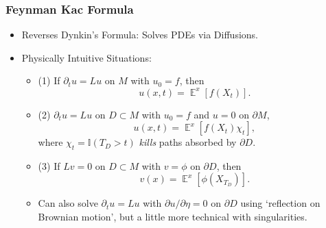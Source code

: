 \documentclass[usenames,dvipsnames,12pt]{beamer}
\DeclareMathOperator{\EE}{\mathbb{E}}
\begin{document}
\begin{frame}
    \frametitle{Feynman Kac Formula}

    \begin{itemize}
        \item Reverses Dynkin's Formula: Solves PDEs via Diffusions.

        \pause
        \item Physically Intuitive Situations:
        \begin{itemize}
            \pause
            \item (1) If $\partial_t u = Lu$ on $M$ with $u_0 = f$, then
            \[ u(x,t) = \EE^x[f(X_t)]. \]

            \pause
            \item (2) $\partial_t u = Lu$ on $D \subset M$ with $u_0 = f$ and $u = 0$ on $\partial M$,
            \[ u(x,t) = \EE^x[f(X_t) \chi_t], \]
            where $\chi_t = \mathbb{I}(T_D > t)$ \emph{kills} paths absorbed by $\partial D$.

            \pause
            \item (3) If $Lv = 0$ on $D \subset M$ with $v = \phi$ on $\partial D$, then
            \[ v(x) = \EE^x \left[ \phi(X_{T_D}) \right]. \]

            \pause
            \item Can also solve $\partial_t u = Lu$ with $\partial u / \partial \eta = 0$ on $\partial D$ using `reflection on Brownian motion', but a little more technical with singularities.
        \end{itemize}
    \end{itemize}
\end{frame}
\end{document}
